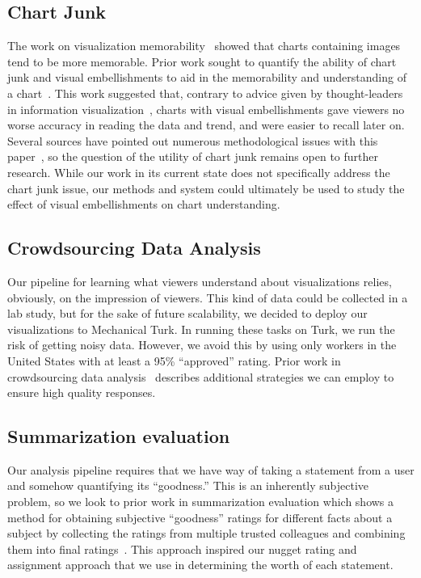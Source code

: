 \documentclass{sigchi}
\begin{document}
\subsection{Chart Junk}

The work on visualization memorability~\cite{borkin2013makes} showed
that charts containing images tend to be more memorable. Prior work
sought to quantify the ability of chart junk and visual embellishments
to aid in the memorability and understanding of a
chart~\cite{bateman2010useful}. This work suggested that, contrary to
advice given by thought-leaders in information
visualization~\cite{tufte1983visual}, charts with visual
embellishments gave viewers no worse accuracy in reading the data and
trend, and were easier to recall later on. Several sources have
pointed out numerous methodological issues with this
paper~\cite{Few,junkcharts}, so the question of the utility of chart
junk remains open to further research. While our work in its current
state does not specifically address the chart junk issue, our methods
and system could ultimately be used to study the effect of visual
embellishments on chart understanding.

\subsection{Crowdsourcing Data Analysis}

Our pipeline for learning what viewers understand about visualizations
relies, obviously, on the impression of viewers. This kind of data
could be collected in a lab study, but for the sake of future
scalability, we decided to deploy our visualizations to Mechanical
Turk. In running these tasks on Turk, we run the risk of getting noisy
data. However, we avoid this by using only workers in the United
States with at least a 95\% ``approved'' rating. Prior work in
crowdsourcing data analysis~\cite{willett2012strategies} describes
additional strategies we can employ to ensure high quality responses.

\subsection{Summarization evaluation}

Our analysis pipeline requires that we have way of taking a statement
from a user and somehow quantifying its ``goodness.'' This is an
inherently subjective problem, so we look to prior work in
summarization evaluation which shows a method for obtaining subjective
``goodness'' ratings for different facts about a subject by collecting
the ratings from multiple trusted colleagues and combining them into
final ratings~\cite{lin2006will}. This approach inspired our nugget
rating and assignment approach that we use in determining the worth of
each statement.
\end{document}
